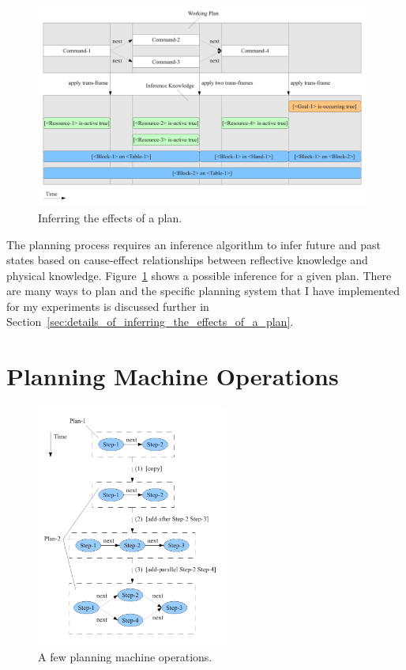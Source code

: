 \begin{figure}[bth]
  \center
  \includegraphics[width=11cm]{gfx/infer_plan_effects}
  \caption[Inferring the effects of a plan]{Inferring the effects of
    a plan.}
  \label{fig:infer_plan_effects}
\end{figure}

The planning process requires an inference algorithm to infer future
and past states based on cause-effect relationships between reflective
knowledge and physical knowledge.  Figure~\ref{fig:infer_plan_effects}
shows a possible inference for a given plan.  There are many ways to
plan and the specific planning system that I have implemented for my
experiments is discussed further in
Section~\ref{sec:details_of_inferring_the_effects_of_a_plan}.


\section{Planning Machine Operations}

\begin{figure}[bth]
  \center
  \includegraphics[height=8cm]{gfx/planning_machine_operations}
  \caption[A few planning machine operations]{A few planning machine operations.}
  \label{fig:planning_machine_operations}
\end{figure}

